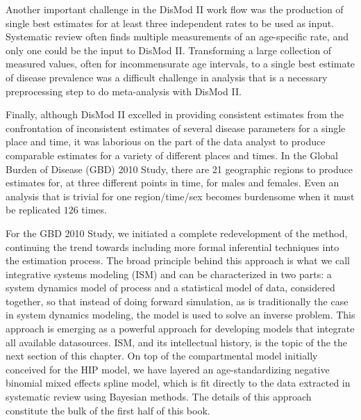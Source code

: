 Another important challenge in the DisMod II work flow was the
production of single best estimates for at least three independent
rates to be used as input.  Systematic review often finds multiple
measurements of an age-specific rate, and only one could be the input to
DisMod II.  Transforming a large collection of measured values, often
for incommensurate age intervals, to a single best estimate of disease
prevalence was a difficult challenge in analysis that is a necessary
preprocessing step to do meta-analysis with DisMod II.

Finally, although DisMod II excelled in providing consistent estimates
from the confrontation of inconsistent estimates of several disease
parameters for a single place and time, it was laborious on the part
of the data analyst to produce comparable estimates for a variety of
different places and times. In the Global Burden of Disease (GBD) 2010
Study, there are 21 geographic regions to produce estimates for, at
three different points in time, for males and females. Even an
analysis that is trivial for one region/time/sex becomes burdensome
when it must be replicated $126$ times.

For the GBD 2010 Study, we initiated a complete redevelopment of the
method, continuing the trend towards including more formal inferential
techniques into the estimation process.  The broad principle behind
this approach is what we call integrative systems modeling (ISM) and
can be characterized in two parts: a system dynamics model of process
and a statistical model of data, considered together, so that instead
of doing forward simulation, as is traditionally the case in system
dynamics modeling, the model is used to solve an inverse problem. This
approach is emerging as a powerful approach for developing models that
integrate all available datasources.  ISM, and its intellectual
history, is the topic of the the next section of this chapter.  On top
of the compartmental model initially conceived for the HIP model, we
have layered an age-standardizing negative binomial mixed effects
spline model, which is fit directly to the data extracted in
systematic review using Bayesian methods.  The details of this
approach constitute the bulk of the first half of this book.


